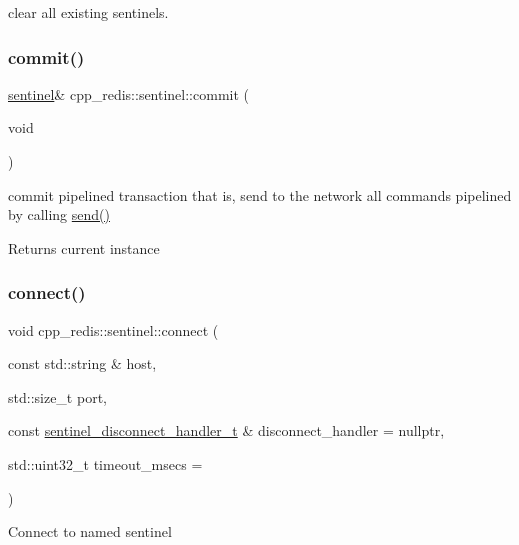clear all existing sentinels. \mbox{\label{classcpp__redis_1_1sentinel_ad4f85d486499f82225b244f85091b31e}} 
\subsubsection{\texorpdfstring{commit()}{commit()}}
{\footnotesize\ttfamily \hyperlink{classcpp__redis_1_1sentinel}{sentinel}\& cpp\+\_\+redis\+::sentinel\+::commit (\begin{DoxyParamCaption}\item[{void}]{ }\end{DoxyParamCaption})}

commit pipelined transaction that is, send to the network all commands pipelined by calling \hyperlink{classcpp__redis_1_1sentinel_a0df522dbd7debda4e73f616a62d6f5ee}{send()}

\begin{DoxyReturn}{Returns}
current instance 
\end{DoxyReturn}
\mbox{\label{classcpp__redis_1_1sentinel_a1dfba8240daf7cfa7502f57957cffbda}} 
\subsubsection{\texorpdfstring{connect()}{connect()}}
{\footnotesize\ttfamily void cpp\+\_\+redis\+::sentinel\+::connect (\begin{DoxyParamCaption}\item[{const std\+::string \&}]{host,  }\item[{std\+::size\+\_\+t}]{port,  }\item[{const \hyperlink{classcpp__redis_1_1sentinel_a923e06b5b700c16dffec8a01d2fa9aa4}{sentinel\+\_\+disconnect\+\_\+handler\+\_\+t} \&}]{disconnect\+\_\+handler = {\ttfamily nullptr},  }\item[{std\+::uint32\+\_\+t}]{timeout\+\_\+msecs = {} }\end{DoxyParamCaption})}

Connect to named sentinel


